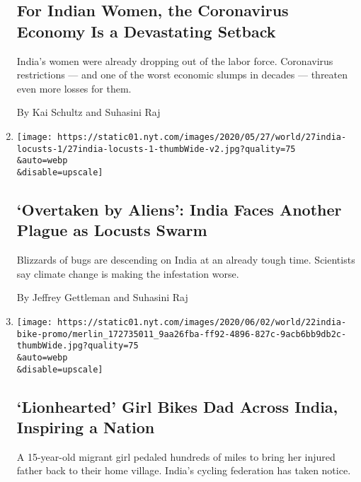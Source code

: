 \begin{enumerate}
{  \subsection{For Indian Women, the Coronavirus Economy Is a Devastating
  Setback}\label{for-indian-women-the-coronavirus-economy-is-a-devastating-setback}}

  India's women were already dropping out of the labor force.
  Coronavirus restrictions --- and one of the worst economic slumps in
  decades --- threaten even more losses for them.

  By Kai Schultz and Suhasini Raj
\item
  \href{/2020/05/27/world/asia/india-locusts-jaipur.html}{}

  \texttt{[image: https://static01.nyt.com/images/2020/05/27/world/27india-locusts-1/27india-locusts-1-thumbWide-v2.jpg?quality=75\\\&auto=webp\\\&disable=upscale]}

  \hypertarget{overtaken-by-aliens-india-faces-another-plague-as-locusts-swarm}{%
  \subsection{`Overtaken by Aliens': India Faces Another Plague as
  Locusts
  Swarm}\label{overtaken-by-aliens-india-faces-another-plague-as-locusts-swarm}}

  Blizzards of bugs are descending on India at an already tough time.
  Scientists say climate change is making the infestation worse.

  By Jeffrey Gettleman and Suhasini Raj
\item
  \href{/2020/05/22/world/asia/india-bicycle-girl-migrants.html}{}

  \texttt{[image: https://static01.nyt.com/images/2020/06/02/world/22india-bike-promo/merlin\_172735011\_9aa26fba-ff92-4896-827c-9acb6bb9db2c-thumbWide.jpg?quality=75\\\&auto=webp\\\&disable=upscale]}

  \hypertarget{lionhearted-girl-bikes-dad-across-india-inspiring-a-nation}{%
  \subsection{`Lionhearted' Girl Bikes Dad Across India, Inspiring a
  Nation}\label{lionhearted-girl-bikes-dad-across-india-inspiring-a-nation}}

  A 15-year-old migrant girl pedaled hundreds of miles to bring her
  injured father back to their home village. India's cycling federation
  has taken notice.


\end{enumerate}
